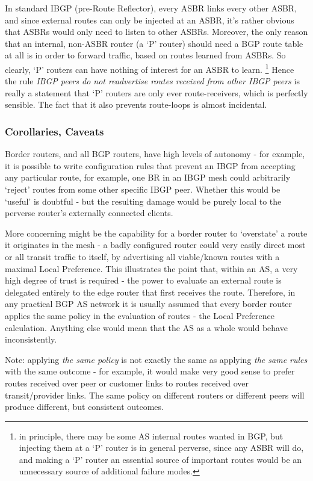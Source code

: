 In standard IBGP (pre-Route Reflector), every ASBR links every other ASBR, and since external routes can only be injected at an ASBR, it's rather obvious that ASBRs would only need to listen to other ASBRs.  Moreover, the only reason that an internal, non-ASBR router (a `P' router) should need a BGP route table at all is in order to forward traffic, based on routes learned from ASBRs.  So clearly, `P' routers can have nothing of interest for an ASBR to learn. \footnote{in principle, there may be some AS internal routes wanted in BGP, but injecting them at a `P' router is in general perverse, since any ASBR will do, and making a `P' router an essential source of important routes would be an unnecessary source of additional failure modes.} Hence the rule \textit{IBGP peers do not readvertise routes received from other IBGP peers} is really a statement that `P' routers are only ever route-receivers, which is perfectly sensible.  The fact that it also prevents route-loops is almost incidental.

\subsubsection{Corollaries, Caveats}
Border routers, and all BGP routers, have high levels of autonomy - for example,
it is possible to write configuration rules that prevent an IBGP from accepting
any particular route, for example, one BR in an IBGP mesh could arbitrarily
`reject' routes from some other specific IBGP peer.  Whether this would be `useful'
is doubtful - but the resulting damage would be purely local to the perverse
router's externally connected clients.

More concerning might be the capability for a border router to `overstate' a
route it
originates in the mesh - a badly configured router could very easily direct most or all
transit traffic to itself, by advertising all viable/known routes with a maximal
Local Preference.
This illustrates the point that, within an AS, a very high degree of trust is
required - the power to evaluate an external route is delegated entirely to the
edge router that first receives the route.
Therefore, in any practical BGP AS network it is usually assumed that every
border router applies the same policy in the evaluation of routes - the Local
Preference calculation.
Anything else would mean that the AS as a whole would behave inconsistently.

Note: applying \textit{the same policy} is not exactly the same as applying \textit{the same
rules} with the same outcome - for example, it would make very good sense to
prefer routes received over peer or customer links to routes received over
transit/provider links.
The same policy on different routers or different peers will produce different, but consistent outcomes.

